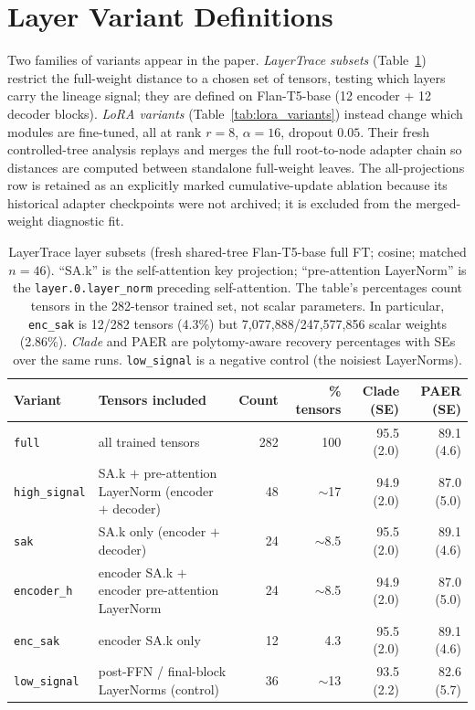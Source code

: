 \documentclass{article}
\theoremstyle{definition}
\theoremstyle{plain}
\begin{document}
\section{Layer Variant Definitions}
\label{app:layers}
Two families of variants appear in the paper. \emph{LayerTrace subsets} (Table~\ref{tab:layer_subsets})
restrict the full-weight distance to a chosen set of tensors, testing which layers carry the lineage
signal; they are defined on Flan-T5-base (12 encoder + 12 decoder blocks). \emph{LoRA variants}
(Table~\ref{tab:lora_variants}) instead change which modules are fine-tuned, all at rank $r=8$,
$\alpha=16$, dropout $0.05$. Their fresh controlled-tree analysis replays and merges the full
root-to-node adapter chain so distances are computed between standalone full-weight leaves. The
all-projections row is retained as an explicitly marked cumulative-update ablation because its
historical adapter checkpoints were not archived; it is excluded from the merged-weight diagnostic fit.

\begin{table}[h]
\caption{LayerTrace layer subsets (fresh shared-tree Flan-T5-base full FT; cosine; matched $n=46$). ``SA.k'' is the self-attention key projection;
``pre-attention LayerNorm'' is the \texttt{layer.0.layer\_norm} preceding self-attention. The table's
percentages count tensors in the 282-tensor trained set, not scalar parameters. In particular,
\texttt{enc\_sak} is 12/282 tensors (4.3\%) but 7,077,888/247,577,856 scalar weights (2.86\%).
\emph{Clade} and PAER are polytomy-aware recovery percentages with SEs over the same runs.
\texttt{low\_signal} is a negative control (the noisiest LayerNorms).}
\label{tab:layer_subsets}
\centering
\small
\setlength{\tabcolsep}{3pt}
\begin{tabular}{llrrrr}
\toprule
Variant & Tensors included & Count & \% tensors & Clade (SE) & PAER (SE) \\
\midrule
\texttt{full}         & all trained tensors                                   & 282 & 100          & 95.5 (2.0) & 89.1 (4.6) \\
\texttt{high\_signal} & SA.k $+$ pre-attention LayerNorm (encoder $+$ decoder) & 48  & $\sim$17     & 94.9 (2.0) & 87.0 (5.0) \\
\texttt{sak}          & SA.k only (encoder $+$ decoder)                       & 24  & $\sim$8.5    & 95.5 (2.0) & 89.1 (4.6) \\
\texttt{encoder\_h}   & encoder SA.k $+$ encoder pre-attention LayerNorm      & 24  & $\sim$8.5    & 94.9 (2.0) & 87.0 (5.0) \\
\texttt{enc\_sak}     & encoder SA.k only                                     & 12  & 4.3           & 95.5 (2.0) & 89.1 (4.6) \\
\texttt{low\_signal}  & post-FFN / final-block LayerNorms (control)           & 36  & $\sim$13     & 93.5 (2.2) & 82.6 (5.7) \\
\bottomrule
\end{tabular}
\end{table}
\end{document}
